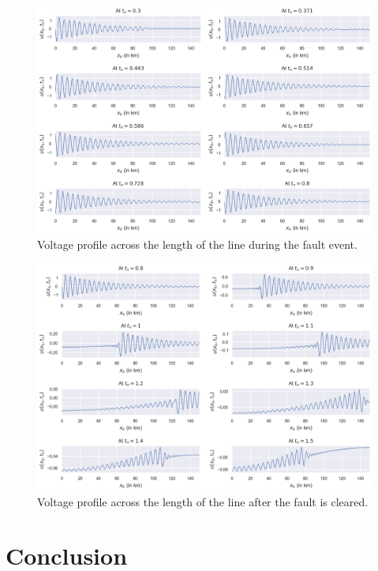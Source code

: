\documentclass{article}
\begin{document}
\begin{figure}[t!]
	\centering
	\includegraphics[scale=0.7]{simulating a faulted bus - voltage profiles during fault.png}
	\caption{Voltage profile across the length of the line during the fault event.}
	\label{fig: Simulating a Faulted Bus results: Voltage profiles at during fault}
\end{figure}

\begin{figure}[t!]
	\centering
	\includegraphics[scale=0.7]{simulating a faulted bus - voltage profiles at post-fault.png}
	\caption{Voltage profile across the length of the line after the fault is cleared.}
	\label{fig: Simulating a Faulted Bus results: Voltage profiles at post-fault}
\end{figure}

\section{Conclusion}
\label{sec: Conclusion}
\end{document}
